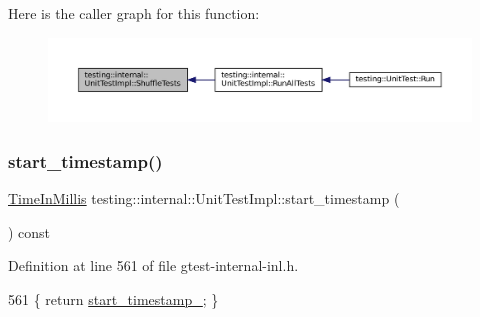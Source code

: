 Here is the caller graph for this function\+:
\nopagebreak
\begin{figure}[H]
\begin{center}
\leavevmode
\includegraphics[width=350pt]{classtesting_1_1internal_1_1UnitTestImpl_aaaa38e6a4372e6bb9bbe3143a3a32b65_icgraph}
\end{center}
\end{figure}
\mbox{\label{classtesting_1_1internal_1_1UnitTestImpl_abb02dfd689760c6323acec725d9631d5}} 
\subsubsection{\texorpdfstring{start\+\_\+timestamp()}{start\_timestamp()}}
{\footnotesize\ttfamily \hyperlink{namespacetesting_1_1internal_a66a845df404b38fe85c5e14a069f255a}{Time\+In\+Millis} testing\+::internal\+::\+Unit\+Test\+Impl\+::start\+\_\+timestamp (\begin{DoxyParamCaption}{ }\end{DoxyParamCaption}) const\hspace{0.3cm}{\ttfamily [inline]}}



Definition at line 561 of file gtest-\/internal-\/inl.\+h.


\begin{DoxyCode}
561 \{ \textcolor{keywordflow}{return} \hyperlink{classtesting_1_1internal_1_1UnitTestImpl_a2114799ed634ee849b9dcd9728f9b7b6}{start\_timestamp\_}; \}
\end{DoxyCode}
\mbox{\label{classtesting_1_1internal_1_1UnitTestImpl_a2db3a2b3fed8065dbdd768ee407bf67e}} 
